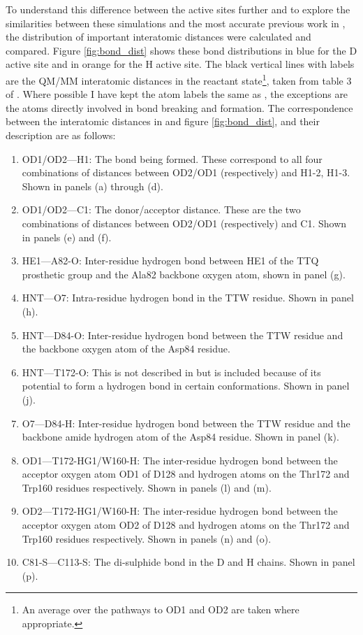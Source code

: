 To understand this difference between the active sites further and to explore the similarities between these simulations and the most accurate previous work in \cite{ranaghanInitioQMMM2017}, the distribution of important interatomic distances were calculated and compared. Figure \ref{fig:bond_dist} shows these bond distributions in blue for the D active site and in orange for the H active site. The black vertical lines with labels are the QM/MM interatomic distances in the reactant state\footnote{An average over the pathways to OD1 and OD2 are taken where appropriate.}, taken from table 3 of \cite{ranaghanInitioQMMM2017}. Where possible I have kept the atom labels the same as \cite{ranaghanInitioQMMM2017}, the exceptions are the atoms directly involved in bond breaking and formation. The correspondence between the interatomic distances in \cite{ranaghanInitioQMMM2017} and figure \ref{fig:bond_dist}, and their description are as follows: 
\begin{enumerate}
    \item OD1/OD2---H1:  The bond being formed. These correspond to all four combinations of distances between OD2/OD1 (respectively) and H1-2, H1-3. Shown in panels (a) through (d). 
    \item OD1/OD2---C1: The donor/acceptor distance. These are the two combinations of distances between OD2/OD1 (respectively) and C1. Shown in panels (e) and (f). 
    \item HE1---A82-O: Inter-residue hydrogen bond between HE1 of the TTQ prosthetic group and the Ala82 backbone oxygen atom, shown in panel (g). 
    \item HNT---O7: Intra-residue hydrogen bond in the TTW residue. Shown in panel (h). 
    \item HNT---D84-O: Inter-residue hydrogen bond between the TTW residue and the backbone oxygen atom of the Asp84 residue. 
    \item HNT---T172-O: This is not described in \cite{ranaghanInitioQMMM2017} but is included because of its potential to form a hydrogen bond in certain conformations. Shown in panel (j). 
    \item O7---D84-H: Inter-residue hydrogen bond between the TTW residue and the backbone amide hydrogen atom of the Asp84 residue. Shown in panel (k). 
    \item OD1---T172-HG1/W160-H: The inter-residue hydrogen bond between the acceptor oxygen atom OD1 of D128 and hydrogen atoms on the Thr172 and Trp160 residues respectively. Shown in panels (l) and (m).
    \item OD2---T172-HG1/W160-H: The inter-residue hydrogen bond between the acceptor oxygen atom OD2 of D128 and hydrogen atoms on the Thr172 and Trp160 residues respectively. Shown in panels (n) and (o).\label{o1_t172}
    \item C81-S---C113-S: The di-sulphide bond in the D and H chains. Shown in panel (p). \label{cs_cs} 
\end{enumerate}

